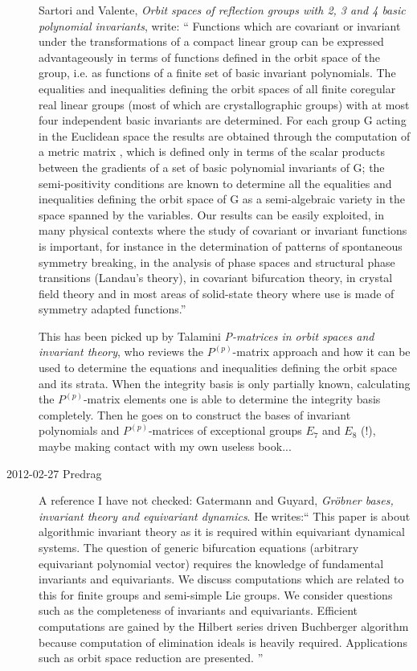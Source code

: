 \begin{description}
Sartori and Valente, {\em Orbit spaces of reflection groups with
         2, 3 and 4 basic polynomial invariants}, write: ``
Functions which are covariant or invariant under the transformations of a
compact linear group can be expressed advantageously in terms of
functions defined in the orbit space of the group, i.e. as functions of a
finite set of basic invariant polynomials. The equalities and
inequalities defining the orbit spaces of all finite coregular real
linear groups (most of which are crystallographic groups) with at most
four independent basic invariants are determined. For each group G acting
in the Euclidean space the results are obtained through the computation
of a metric matrix , which is defined only in terms of the scalar
products between the gradients of a set of basic polynomial invariants of
G; the semi-positivity conditions are known to determine all the
equalities and inequalities defining the orbit space of G as a
semi-algebraic variety in the space  spanned by the variables. Our
results can be easily exploited, in many physical contexts where the
study of covariant or invariant functions is important, for instance in
the determination of patterns of spontaneous symmetry breaking, in the
analysis of phase spaces and structural phase transitions (Landau's
theory), in covariant bifurcation theory, in crystal field theory and in
most areas of solid-state theory where use is made of symmetry adapted
functions.''

This has been picked up by Talamini
{\em P-matrices in orbit spaces and invariant theory}, who reviews the
$P^{(p)}$-matrix approach and how it can be used to determine the
equations and inequalities defining the orbit space and its strata. When
the integrity basis is only partially known, calculating the
$P^{(p)}$-matrix elements one is able to determine the integrity basis
completely. Then he goes on to construct the
bases of invariant polynomials and $P^{(p)}$-matrices of exceptional
groups $E_7$ and $E_8$ (!), maybe making contact with my own useless
book...


\item[2012-02-27 Predrag]
A reference I have not checked: Gatermann and Guyard,
\emph{Gr\"obner bases, invariant theory and equivariant dynamics}. He writes:``
This paper is about algorithmic invariant theory as it is required within
equivariant dynamical systems. The question of generic bifurcation
equations (arbitrary equivariant polynomial vector) requires the
knowledge of fundamental invariants and equivariants. We discuss
computations which are related to this for finite groups and semi-simple
Lie groups. We consider questions such as the completeness of invariants
and equivariants. Efficient computations are gained by the Hilbert series
driven Buchberger algorithm because computation of elimination ideals is
heavily required. Applications such as orbit space reduction are
presented.
''


\end{description}
